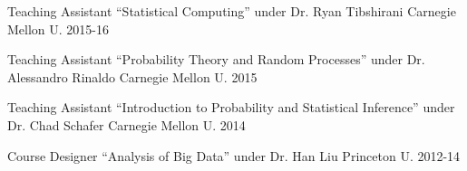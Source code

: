

%

\begin{cvhonors}

  \cvhonor
    {Teaching Assistant} %
    {``Statistical Computing'' under Dr. Ryan Tibshirani} %
    {Carnegie Mellon U.} %
    {2015-16} %

  \cvhonor
    {Teaching Assistant} %
    {``Probability Theory and Random Processes'' under Dr. Alessandro Rinaldo} %
    {Carnegie Mellon U.} %
    {2015} %

  \cvhonor
    {Teaching Assistant} %
    {``Introduction to Probability and Statistical Inference'' under Dr. Chad Schafer} %
    {Carnegie Mellon U.} %
    {2014} %

  \cvhonor
    {Course Designer} %
    {``Analysis of Big Data'' under Dr. Han Liu} %
    {Princeton U.} %
    {2012-14} %


\end{cvhonors}
